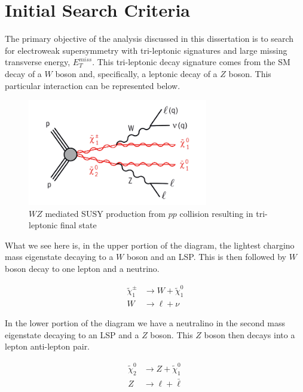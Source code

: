 \section{Initial Search Criteria}
The primary objective of the analysis discussed in this dissertation is to search for electroweak supersymmetry with tri-leptonic signatures and large missing transverse energy, $E_{T}^{miss}$. 
This tri-leptonic decay signature comes from the SM decay of a $W$ boson and, specifically, a leptonic decay of a $Z$ boson. This particular interaction can be represented below.

\begin{figure}[H] %
   \centering
   \includegraphics[width=0.7\textwidth]{Pictures/WZSUSY.png} 
   \caption{$WZ$ mediated SUSY production from $pp$ collision resulting in tri-leptonic final state}
   \label{fig:SUSYWZ}
\end{figure}

\noindent What we see here is, in the upper portion of the diagram, the lightest chargino mass eigenstate decaying to a $W$ boson and an LSP. 
This is then followed by $W$ boson decay to one lepton and a neutrino.

\begin{align}
\tilde{\chi}_{1}^{\pm} &\rightarrow W + \tilde{\chi}_{1}^{0} \\
W &\rightarrow \ell + \nu
\end{align}

\noindent In the lower portion of the diagram we have a neutralino in the second mass eigenstate decaying to an LSP and a $Z$ boson. This $Z$ boson then decays into a lepton anti-lepton pair.

\begin{align}
\tilde{\chi}_{2}^{0} &\rightarrow Z + \tilde{\chi}_{1}^{0} \label{eqn:ChiToZ} \\
Z &\rightarrow \ell + \bar{\ell}
\end{align}

